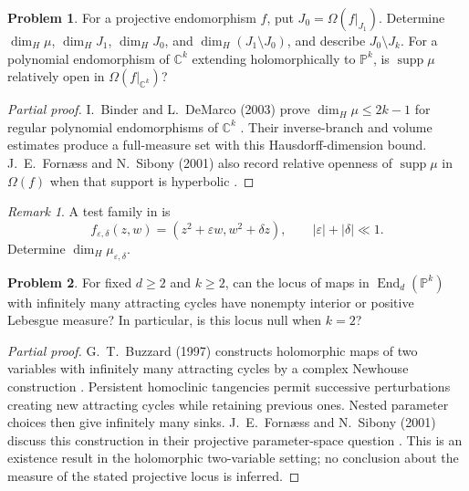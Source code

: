 \documentclass[11pt,reqno]{amsart}
\theoremstyle{definition}
\newtheorem{problem}{Problem}[section]
\theoremstyle{remark}
\newtheorem*{remark}{Remark}
\begin{document}
\begin{problem}\label{FS-2.17}\label{FS-2.18}
For a projective endomorphism $f$, put $J_0=\Omega(f|_{J_1})$. Determine $\dim_H\mu$, $\dim_HJ_1$, $\dim_HJ_0$, and $\dim_H(J_1\setminus J_0)$, and describe $J_0\setminus J_k$. For a polynomial endomorphism of $\mathbb C^k$ extending holomorphically to $\mathbb P^k$, is $\operatorname{supp}\mu$ relatively open in $\Omega(f|_{\mathbb C^k})$?
\end{problem}
\begin{proof}[Partial proof]
I.~Binder and L.~DeMarco (2003) prove $\dim_H\mu\leq2k-1$ for regular polynomial endomorphisms of $\mathbb C^k$ \cite{FS-Binder}. Their inverse-branch and volume estimates produce a full-measure set with this Hausdorff-dimension bound. J.~E.~Forn\ae ss and N.~Sibony (2001) also record relative openness of $\operatorname{supp}\mu$ in $\Omega(f)$ when that support is hyperbolic \cite[Question~2.17]{FS2001}.
\end{proof}
\begin{remark}
A test family in \cite[Question~2.17]{FS2001} is
\[
 f_{\varepsilon,\delta}(z,w)=(z^2+\varepsilon w,w^2+\delta z),
 \qquad |\varepsilon|+|\delta|\ll1.
\]
Determine $\dim_H\mu_{\varepsilon,\delta}$.
\end{remark}

\begin{problem}\label{b95-10-3-7}\label{FS-2.1}
For fixed $d\geq2$ and $k\geq2$, can the locus of maps in $\operatorname{End}_d(\mathbb P^k)$ with infinitely many attracting cycles have nonempty interior or positive Lebesgue measure? In particular, is this locus null when $k=2$?
\end{problem}
\begin{proof}[Partial proof]
G.~T.~Buzzard (1997) constructs holomorphic maps of two variables with infinitely many attracting cycles by a complex Newhouse construction \cite{FS-Buzzard}. Persistent homoclinic tangencies permit successive perturbations creating new attracting cycles while retaining previous ones. Nested parameter choices then give infinitely many sinks. J.~E.~Forn\ae ss and N.~Sibony (2001) discuss this construction in their projective parameter-space question \cite[Question~2.1]{FS2001}. This is an existence result in the holomorphic two-variable setting; no conclusion about the measure of the stated projective locus is inferred.
\end{proof}
\end{document}
